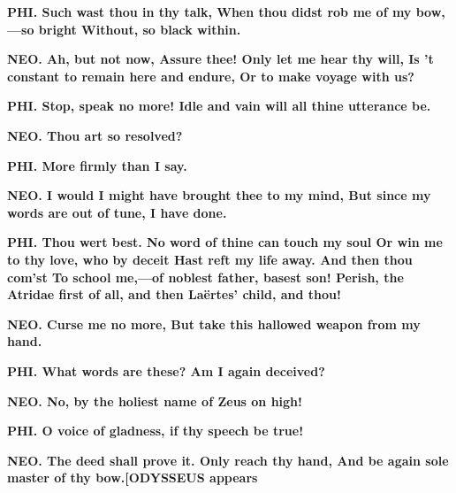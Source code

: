 \documentclass[11pt,letter]{book}
\begin{document}
\par \textbf{PHI. Such wast thou in thy talk, When thou didst rob me of my bow,—so bright Without, so black within.}
\par 

\par \textbf{NEO. Ah, but not now, Assure thee! Only let me hear thy will, Is ’t constant to remain here and endure, Or to make voyage with us?}
\par 

\par \textbf{PHI. Stop, speak no more! Idle and vain will all thine utterance be.}
\par 

\par \textbf{NEO. Thou art so resolved?}
\par 

\par \textbf{PHI. More firmly than I say.}
\par 

\par \textbf{NEO. I would I might have brought thee to my mind, But since my words are out of tune, I have done.}
\par 

\par \textbf{PHI. Thou wert best. No word of thine can touch my soul Or win me to thy love, who by deceit Hast reft my life away. And then thou com’st To school me,—of noblest father, basest son! Perish, the Atridae first of all, and then Laërtes’ child, and thou!}
\par 

\par \textbf{NEO. Curse me no more, But take this hallowed weapon from my hand.}
\par 

\par \textbf{PHI. What words are these? Am I again deceived?}
\par 

\par \textbf{NEO. No, by the holiest name of Zeus on high!}
\par 

\par \textbf{PHI. O voice of gladness, if thy speech be true!}
\par 

\par \textbf{NEO. The deed shall prove it. Only reach thy hand, And be again sole master of thy bow.[ODYSSEUS appears}
\par 
\end{document}
